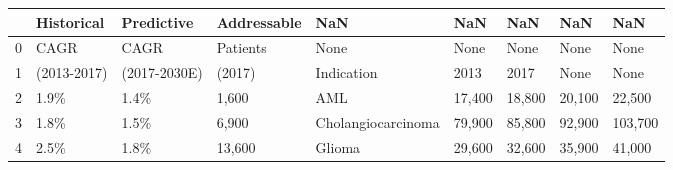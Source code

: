 \begin{tabular}{lllllllll}
\toprule
{} &   Historical &    Predictive & Addressable &                 NaN &     NaN &     NaN &     NaN &      NaN \\
\midrule
0 &         CAGR &          CAGR &    Patients &                None &    None &    None &    None &     None \\
1 &  (2013-2017) &  (2017-2030E) &      (2017) &          Indication &    2013 &    2017 &    None &     None \\
2 &         1.9\% &          1.4\% &       1,600 &                 AML &  17,400 &  18,800 &  20,100 &   22,500 \\
3 &         1.8\% &          1.5\% &       6,900 &  Cholangiocarcinoma &  79,900 &  85,800 &  92,900 &  103,700 \\
4 &         2.5\% &          1.8\% &      13,600 &              Glioma &  29,600 &  32,600 &  35,900 &   41,000 \\
\bottomrule
\end{tabular}
